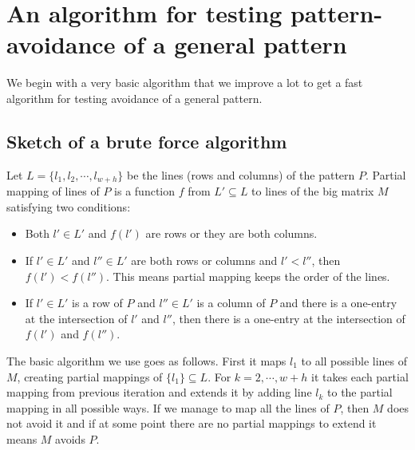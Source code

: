 \chapter{An algorithm for testing pattern-avoidance of a general pattern}
We begin with a very basic algorithm that we improve a lot to get a fast algorithm for testing avoidance of a general pattern.

\section{Sketch of a brute force algorithm}
Let $L=\{l_1,l_2,\cdots,l_{w+h}\}$ be the lines (rows and columns) of the pattern $P$. Partial mapping of lines of $P$ is a function $f$ from $L'\subseteq L$ to lines of the big matrix $M$ satisfying two conditions: 
\begin{itemize}
\item Both $l'\in L'$ and $f(l')$ are rows or they are both columns.
\item If $l'\in L'$ and $l''\in L'$ are both rows or columns and $l'<l''$, then $f(l')<f(l'')$. This means partial mapping keeps the order of the lines.
\item If $l'\in L'$ is a row of $P$ and $l''\in L'$ is a column of $P$ and there is a one-entry at the intersection of $l'$ and $l''$, then there is a one-entry at the intersection of $f(l')$ and $f(l'')$.
\end{itemize}
The basic algorithm we use goes as follows. First it maps $l_1$ to all possible lines of $M$, creating partial mappings of $\{l_1\}\subseteq L$. For $k=2,\cdots,w+h$ it takes each partial mapping from previous iteration and extends it by adding line $l_k$ to the partial mapping in all possible ways. If we manage to map all the lines of $P$, then $M$ does not avoid it and if at some point there are no partial mappings to extend it means $M$ avoids $P$.

